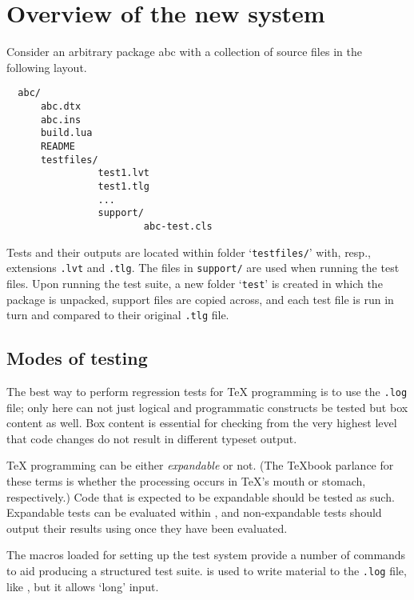 \documentclass[a4paper]{ltugboat}
\begin{document}
\section{Overview of the new system}
\label{sec:overview}

Consider an arbitrary package \textsf{abc} with a collection of source files in the following layout.
\begin{Verbatim}
  abc/
      abc.dtx
      abc.ins
      build.lua
      README
      testfiles/
                test1.lvt
                test1.tlg
                ...
                support/
                        abc-test.cls
\end{Verbatim}
Tests and their outputs are located within folder `\texttt{testfiles/}' with, resp., extensions \texttt{.lvt} and \texttt{.tlg}.
The files in \texttt{support/} are used when running the test files.
Upon running the test suite, a new folder `\texttt{test}' is created in which the package is unpacked, support files are copied across, and each test file is run in turn and compared to their original \texttt{.tlg} file.

\subsection{Modes of testing}

The best way to perform regression tests for \TeX{} programming is to use the \texttt{.log} file; only here can not just logical and programmatic constructs be tested but box content as well.
Box content is essential for checking from the very highest level that code changes do not result in different typeset output.

\TeX{} programming can be either \emph{expandable} or not.
(The \TeX book parlance for these terms is whether the processing occurs in \TeX's mouth or stomach, respectively.)
Code that is expected to be expandable should be tested as such.
Expandable tests can be evaluated within , and non-expandable tests should output their results using  once they have been evaluated.

The macros loaded for setting up the test system provide a number of commands to aid producing a structured test suite.  is used to write material to the \texttt{.log} file, like , but it allows `long' input.
\end{document}
